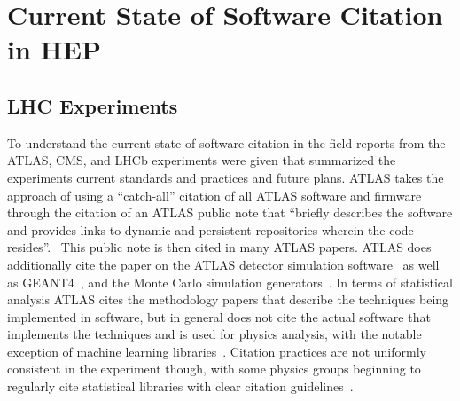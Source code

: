 \section{Current State of Software Citation in HEP}\label{sec:current_state}

\subsection{LHC Experiments}\label{sec:lhc_experiments}

To understand the current state of software citation in the field reports from the ATLAS, CMS, and LHCb experiments were given that summarized the experiments current standards and practices and future plans.
ATLAS takes the approach of using a ``catch-all'' citation of all ATLAS software and firmware through the citation of an ATLAS public note that ``briefly describes the software and provides links to dynamic and persistent repositories wherein the code resides''.~\cite{ATL-SOFT-PUB-2021-001}
This public note is then cited in many ATLAS papers.
ATLAS does additionally cite the paper on the ATLAS detector simulation software~\cite{SOFT-2010-01} as well as GEANT4~\cite{GEANT4:2002zbu}, and the Monte Carlo simulation generators~\cite{Sjostrand:2007gs,Sjostrand:2014zea,Alwall:2014hca,Sherpa:2019gpd}.
In terms of statistical analysis ATLAS cites the methodology papers that describe the techniques being implemented in software, but in general does not cite the actual software that implements the techniques and is used for physics analysis, with the notable exception of machine learning libraries~\cite{chollet2015keras,tensorflow2015-whitepaper}.
Citation practices are not uniformly consistent in the experiment though, with some physics groups beginning to regularly cite statistical libraries with clear citation guidelines~\cite{pyhf,pyhf_joss}.
